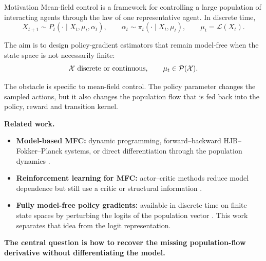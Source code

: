 \documentclass[9pt]{beamer}
\def\Xc{{\cal X}}
\def\Pc{{\cal P}}
\newcommand{\Law}{\mathcal L}
\begin{document}
\begin{frame}{Motivation}
\small
Mean-field control is a framework for controlling a large population of interacting agents through the law of one representative agent. In discrete time,
\[
  X_{t+1}\sim P_t(\cdot\mid X_t,\mu_t,\alpha_t),
  \qquad
  \alpha_t\sim \pi_t(\cdot\mid X_t,\mu_t),
  \qquad
  \mu_t=\Law(X_t).
\]

\vspace{0.15cm}
The aim is to design policy-gradient estimators that remain model-free when the state space is not necessarily finite:
\[
  \Xc \text{ discrete or continuous},\qquad
  \mu_t\in\Pc(\Xc).
\]

\vspace{0.15cm}
The obstacle is specific to mean-field control. The policy parameter changes the sampled actions, but it also changes the population flow that is fed back into the policy, reward and transition kernel.

\vspace{0.2cm}
\small
\textbf{Related work.}
\begin{itemize}
  \item \textbf{Model-based MFC:} dynamic programming, forward--backward HJB--Fokker--Planck systems, or direct differentiation through the population dynamics \cite{pham2018bellman,carmona2018probabilistic,lauriere2021numerical}.
  \item \textbf{Reinforcement learning for MFC:} actor--critic methods reduce model dependence but still use a critic or structural information \cite{frikha2025actor,pham2025actor}.
  \item \textbf{Fully model-free policy gradients:} available in discrete time on finite state spaces by perturbing the logits of the population vector \cite{meunier2026model}. This work separates that idea from the logit representation.
\end{itemize}

\vspace{0.2cm}
\small
\textbf{The central question is how to recover the missing population-flow derivative without differentiating the model.}
\end{frame}
\end{document}

